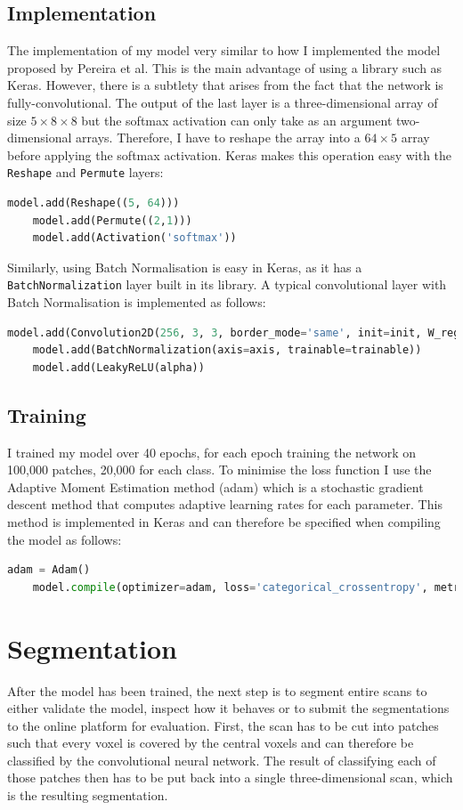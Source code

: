 \documentclass[12pt,a4paper,twoside,openright]{report}
\begin{document}
\subsection{Implementation}
The implementation of my model very similar to how I implemented the model proposed by Pereira et al. This is the main advantage of using a library such as Keras. However, there is a subtlety that arises from the fact that the network is fully-convolutional. The output of the last layer is a three-dimensional array of size $5 \times 8 \times 8$ but the softmax activation can only take as an argument two-dimensional arrays. Therefore, I have to reshape the array into a $64 \times 5$ array before applying the softmax activation. Keras makes this operation easy with the \texttt{Reshape} and \texttt{Permute} layers:
\begin{lstlisting}[language=Python]
	model.add(Reshape((5, 64)))
	model.add(Permute((2,1)))
	model.add(Activation('softmax'))
\end{lstlisting}

Similarly, using Batch Normalisation is easy in Keras, as it has a \texttt{BatchNormalization} layer built in its library. A typical convolutional layer with Batch Normalisation is implemented as follows:
\begin{lstlisting}[language=Python]
	model.add(Convolution2D(256, 3, 3, border_mode='same', init=init, W_regularizer=l2(l)))
	model.add(BatchNormalization(axis=axis, trainable=trainable))
	model.add(LeakyReLU(alpha))
\end{lstlisting}

\subsection{Training}
I trained my model over 40 epochs, for each epoch training the network on 100,000 patches, 20,000 for each class. To minimise the loss function I use the Adaptive Moment Estimation method (adam) \cite{adam} which is a stochastic gradient descent method that computes adaptive learning rates for each parameter. This method is implemented in Keras and can therefore be specified when compiling the model as follows:
\begin{lstlisting}[language=Python]
	adam = Adam()
    model.compile(optimizer=adam, loss='categorical_crossentropy', metrics=['accuracy'])
\end{lstlisting}

\section{Segmentation}
After the model has been trained, the next step is to segment entire scans to either validate the model, inspect how it behaves or to submit the segmentations to the online platform for evaluation. First, the scan has to be cut into patches such that every voxel is covered by the central voxels and can therefore be classified by the convolutional neural network. The result of classifying each of those patches then has to be put back into a single three-dimensional scan, which is the resulting segmentation.
\end{document}
